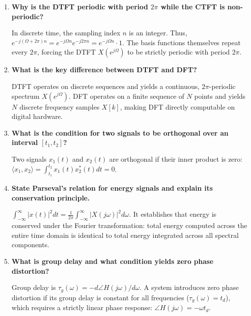 \documentclass[12pt,a4paper]{article}
\newcommand{\Q}[1]{\textbf{#1}\par\noindent\ignorespaces}
\begin{document}
\begin{tcolorbox}[exambox, title={\textbf{Frequently Asked / Viva Questions}}]
\begin{enumerate}[topsep=0pt, label=\textbf{Q\arabic*.}, itemsep=5pt]
  \item \Q{Why is the DTFT periodic with period $2\pi$ while the CTFT is non-periodic?}
  In discrete time, the sampling index $n$ is an integer. Thus, $e^{-j(\Omega + 2\pi)n} = e^{-j\Omega n} e^{-j 2\pi n} = e^{-j\Omega n} \cdot 1$. The basis functions themselves repeat every $2\pi$, forcing the DTFT $X(e^{j\Omega})$ to be strictly periodic with period $2\pi$.

  \item \Q{What is the key difference between DTFT and DFT?}
  DTFT operates on discrete sequences and yields a continuous, $2\pi$-periodic spectrum $X(e^{j\Omega})$. DFT operates on a finite sequence of $N$ points and yields $N$ discrete frequency samples $X[k]$, making DFT directly computable on digital hardware.

  \item \Q{What is the condition for two signals to be orthogonal over an interval $[t_1, t_2]$?}
  Two signals $x_1(t)$ and $x_2(t)$ are orthogonal if their inner product is zero: $\langle x_1, x_2 \rangle = \int_{t_1}^{t_2} x_1(t) x_2^*(t) dt = 0$.

  \item \Q{State Parseval's relation for energy signals and explain its conservation principle.}
  $\int_{-\infty}^{\infty} |x(t)|^2 dt = \frac{1}{2\pi} \int_{-\infty}^{\infty} |X(j\omega)|^2 d\omega$. It establishes that energy is conserved under the Fourier transformation: total energy computed across the entire time domain is identical to total energy integrated across all spectral components.

  \item \Q{What is group delay and what condition yields zero phase distortion?}
  Group delay is $\tau_g(\omega) = -d\angle H(j\omega) / d\omega$. A system introduces zero phase distortion if its group delay is constant for all frequencies ($\tau_g(\omega) = t_d$), which requires a strictly linear phase response: $\angle H(j\omega) = -\omega t_d$.
\end{enumerate}
\end{tcolorbox}
\end{document}
